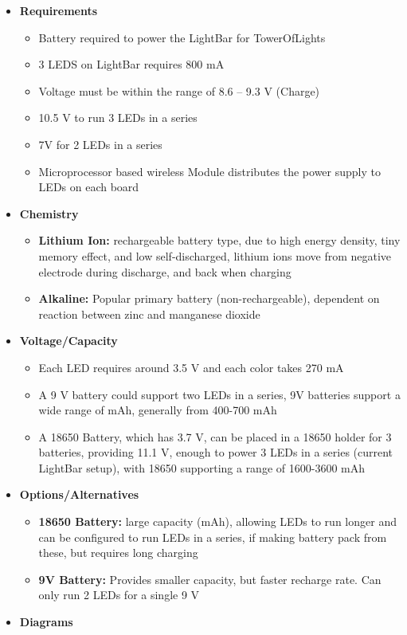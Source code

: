 \documentclass[12pt]{article}
\begin{document}
				{\renewcommand\labelitemi{}
					\begin{itemize}
						\item \textbf{Requirements}
						\begin{itemize}
							\item Battery required to power the LightBar for TowerOfLights
							\item 3 LEDS on LightBar requires 800 mA
							\item Voltage must be within the range of 8.6 – 9.3 V (Charge)
							\item 10.5 V to run 3 LEDs in a series
							\item 7V for 2 LEDs in a series
							\item Microprocessor based wireless Module distributes the power supply to LEDs on each board
						\end{itemize}
						\item \textbf{Chemistry}
						\begin{itemize}
							\item \textbf{Lithium Ion:} rechargeable battery type, due to high energy density, tiny memory effect, and low self-discharged, lithium ions move from negative electrode during discharge, and back when charging
							\item \textbf{Alkaline:} Popular primary battery (non-rechargeable), dependent on reaction between zinc and manganese dioxide
						\end{itemize}
						\item \textbf{Voltage/Capacity}
						\begin{itemize}
							\item Each LED requires around 3.5 V and each color takes 270 mA
							\item A 9 V battery could support two LEDs in a series, 9V batteries support a wide range of mAh, generally from 400-700 mAh
							\item A 18650 Battery, which has 3.7 V, can be placed in a 18650 holder for 3 batteries, providing 11.1 V, enough to power 3 LEDs in a series (current LightBar setup), with 18650 supporting a range of 1600-3600 mAh
						\end{itemize}
						\item \textbf{Options/Alternatives}
						\begin{itemize}
							\item \textbf{18650 Battery:} large capacity (mAh), allowing LEDs to run longer and can be configured to run LEDs in a series, if making battery pack from these, but requires long charging
							\item \textbf{9V Battery:} Provides smaller capacity, but faster recharge rate. Can only run 2 LEDs for a single 9 V
						\end{itemize}
						\item \textbf{Diagrams}
					\end{itemize}

}
\end{document}
